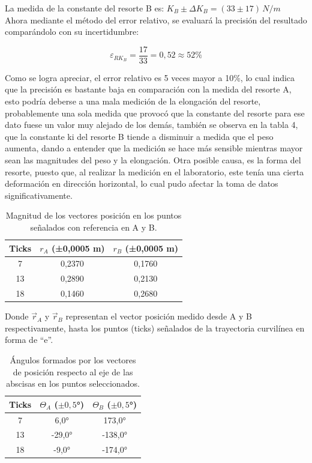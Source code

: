 \documentclass[../main.tex]{subfiles}
\begin{document}
La medida de la constante del resorte B es: $K_B \pm \Delta K_B=(33 \pm 17) \, N/m$ \\

Ahora mediante el método del error relativo, se evaluará la precisión del resultado comparándolo con su incertidumbre:

\[\varepsilon_{RK_B}=\frac{17}{33}=0,52\approx52\%\]

Como se logra apreciar, el error relativo es 5 veces mayor a 10\%,
lo cual indica que la precisión es bastante baja en comparación con la
medida del resorte A, esto podría deberse a una mala medición de la elongación
del resorte, probablemente una sola medida que provocó que la constante del 
resorte para ese dato fuese un valor muy alejado de los demás, también se observa
en la tabla 4, que la constante ki del resorte B tiende a disminuir a medida que 
el peso aumenta, dando a entender que la medición se hace más sensible mientras mayor 
sean las magnitudes del peso y la elongación. Otra posible causa, es la forma del resorte,
puesto que, al realizar la medición en el laboratorio, este tenía una cierta deformación 
en dirección horizontal, lo cual pudo afectar la toma de datos significativamente.

\begin{table}[H]
    \centering
    \begin{tabular}{c|c|c}
        \hline
        Ticks &	$r_A$ (±0,0005 m) & $r_B$ (±0,0005 m) \\
        \hline
        7	& 0,2370	& 0,1760\\
        13	& 0,2890	& 0,2130\\
        18	& 0,1460	& 0,2680\\
        \hline
    \end{tabular}
    \label{ref:tab5}
    \caption{Magnitud de los vectores posición en los puntos señalados con referencia en A y B.}
\end{table}

Donde $\vec{r}_A$ y $\vec{r}_B$ representan el vector posición medido desde A y B
respectivamente, hasta los puntos (ticks) señalados de la trayectoria curvilínea en
forma de “e”.

\begin{table}[H]
    \centering
    \begin{tabular}{c|c|c}
        \hline
        Ticks	& $\Theta_A$  ($\pm 0,5$°) &$\Theta_B$ ($\pm 0,5$°)\\
        \hline
        7	& 6,0°	    & 173,0°\\
        13	& -29,0°	&-138,0°\\
        18	& -9,0° &	-174,0°\\
        \hline
    \end{tabular}
    \label{ref:tab6}
    \caption{Ángulos formados por los vectores de posición respecto al eje de las abscisas en los puntos seleccionados.}
\end{table}
\end{document}
